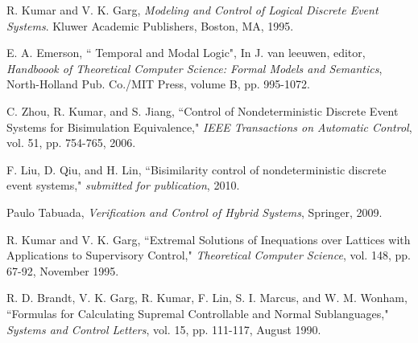 \documentclass[12pt,draftcls,onecolumn]{IEEEtran}
\begin{document}
\begin{thebibliography}{99}
R. Kumar and V. K. Garg, {\it Modeling and Control of Logical Discrete
Event Systems}. Kluwer Academic Publishers, Boston, MA, 1995.







 E. A. Emerson, `` Temporal and Modal Logic", In J. van leeuwen, editor, {\it Handboook of Theoretical Computer Science: Formal
Models and Semantics}, North-Holland Pub. Co./MIT Press, volume B,
pp. 995-1072.

C. Zhou, R. Kumar, and S. Jiang, ``Control of Nondeterministic
Discrete Event Systems for Bisimulation Equivalence," {\it IEEE
Transactions on Automatic Control}, vol. 51, pp. 754-765, 2006.


F. Liu, D. Qiu, and H. Lin, ``Bisimilarity control of nondeterministic discrete event systems," {\it submitted for publication}, 2010.








Paulo Tabuada, {\it Verification and Control of Hybrid
Systems}, Springer, 2009.

R. Kumar and V. K. Garg, ``Extremal Solutions of Inequations over
Lattices with Applications to Supervisory Control," {\it
Theoretical Computer Science}, vol. 148, pp. 67-92, November 1995.


R. D. Brandt, V. K. Garg, R. Kumar, F. Lin, S. I. Marcus, and W.
M. Wonham, ``Formulas for Calculating Supremal Controllable and
Normal Sublanguages," {\it Systems and Control Letters}, vol. 15,
pp. 111-117, August 1990.



\end{thebibliography}
\end{document}

